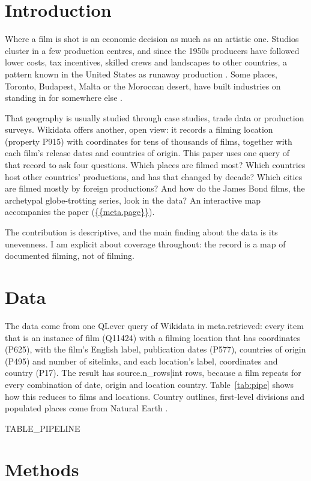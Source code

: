\documentclass[11pt,a4paper]{article}
\begin{document}
\section{Introduction}
Where a film is shot is an economic decision as much as an artistic one. Studios cluster in a few production centres, and since the 1950s producers have followed lower costs, tax incentives, skilled crews and landscapes to other countries, a pattern known in the United States as runaway production \citep{miller,goldsmith}. Some places, Toronto, Budapest, Malta or the Moroccan desert, have built industries on standing in for somewhere else \citep{scott}.

That geography is usually studied through case studies, trade data or production surveys. Wikidata \citep{wikidata} offers another, open view: it records a filming location (property P915) with coordinates for tens of thousands of films, together with each film's release dates and countries of origin. This paper uses one query of that record to ask four questions. Which places are filmed most? Which countries host other countries' productions, and has that changed by decade? Which cities are filmed mostly by foreign productions? And how do the James Bond films, the archetypal globe-trotting series, look in the data? An interactive map accompanies the paper (\url{{{meta.page}}}).

The contribution is descriptive, and the main finding about the data is its unevenness. I am explicit about coverage throughout: the record is a map of documented filming, not of filming.

\section{Data}
The data come from one QLever \citep{qlever} query of Wikidata in {{meta.retrieved}}: every item that is an instance of film (Q11424) with a filming location that has coordinates (P625), with the film's English label, publication dates (P577), countries of origin (P495) and number of sitelinks, and each location's label, coordinates and country (P17). The result has {{source.n_rows|int}} rows, because a film repeats for every combination of date, origin and location country. Table~\ref{tab:pipe} shows how this reduces to films and locations. Country outlines, first-level divisions and populated places come from Natural Earth \citep{naturalearth}.

{{TABLE_PIPELINE}}

\section{Methods}
\end{document}

